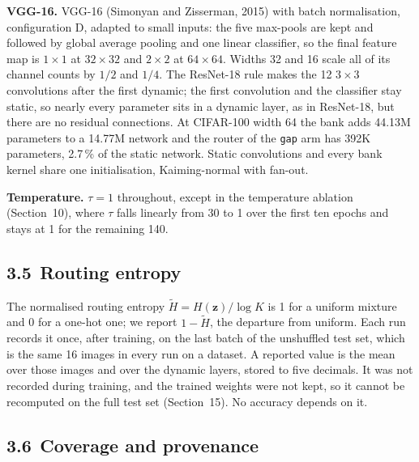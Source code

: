 \documentclass{article}
\begin{document}
\textbf{VGG-16.}  VGG-16 (Simonyan and Zisserman, 2015) with batch
normalisation, configuration D, adapted to small inputs: the five
max-pools are kept and followed by global average pooling and one linear
classifier, so the final feature map is $1\times1$ at $32\times32$ and
$2\times2$ at $64\times64$. Widths 32 and 16 scale all of its channel counts by
$1/2$ and $1/4$. The ResNet-18 rule makes the 12 $3\times3$
convolutions after the first dynamic; the first convolution and the
classifier stay static, so nearly every parameter sits in a dynamic layer,
as in ResNet-18, but there are no residual connections. At CIFAR-100
width 64 the bank adds 44.13M parameters to a 14.77M
network and the router of the \texttt{gap} arm has 392K
parameters, 2.7\,\% of the static network. Static
convolutions and every bank kernel share one initialisation,
Kaiming-normal with fan-out.

\textbf{Temperature.}  $\tau=1$ throughout, except in the temperature
ablation (Section~10), where $\tau$ falls linearly from 30 to
1 over the first ten epochs and stays at 1 for the remaining 140.

\subsection*{3.5 Routing entropy}

The normalised routing entropy $\tilde H=H(\mathbf{z})/\log K$ is 1 for a
uniform mixture and 0 for a one-hot one; we report $1-\tilde H$, the
departure from uniform. Each run records it once, after training, on the
last batch of the unshuffled test set, which is the same 16 images in
every run on a dataset. A reported value is the mean over those images
and over the dynamic layers, stored to five decimals. It was not recorded
during training, and the
trained weights were not kept, so it cannot be recomputed on the full
test set (Section~15). No accuracy depends on it.

\subsection*{3.6 Coverage and provenance}
\end{document}
